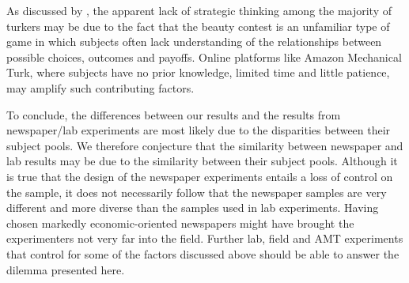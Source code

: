 \documentclass[12pt,review]{elsarticle}
\begin{document}
As discussed by \citet{chou2009control}, the apparent lack of strategic thinking among the majority of turkers may be due to the fact that the beauty contest is an unfamiliar type of game in which subjects often lack understanding of the relationships between possible choices, outcomes and payoffs. Online platforms like Amazon Mechanical Turk, where subjects have no prior knowledge, limited time and little patience, may amplify such contributing factors.

To conclude, the differences between our results and the results from newspaper/lab experiments are most likely due to the disparities between their subject pools. We therefore conjecture that the similarity between newspaper and lab results may be due to the similarity between their subject pools. Although it is true that the design of the newspaper experiments entails a loss of control on the sample, it does not necessarily follow that the newspaper samples are very different and more diverse than the samples used in lab experiments. Having chosen markedly economic-oriented newspapers might have brought the experimenters not very far into the field. Further lab, field and AMT experiments that control for some of the factors discussed above should be able to answer the dilemma presented here.

  

\newpage
\appendix
\setcounter{page}{1}

\end{document}
